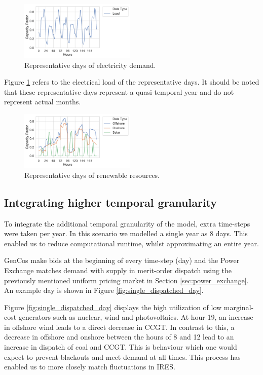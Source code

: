 \documentclass[final,3p,times,twocolumn,numbers]{elsarticle}
\begin{document}
\begin{figure}
\centering
\includegraphics[width=0.49\textwidth]{figures/methods_and_materials/clusters_results_load.pdf}
\caption{Representative days of electricity demand.}
\label{fig:clusters_compared_load}
\end{figure}

Figure \ref{fig:clusters_compared_load} refers to the electrical load of the representative days. It should be noted that these representative days represent a quasi-temporal year and do not represent actual months.


\begin{figure}
\centering
\includegraphics[width=0.49\textwidth]{figures/methods_and_materials/clusters_results_resources.pdf}
\caption{Representative days of renewable resources.}
\label{fig:clusters_compared_resources}
\end{figure}


\subsection{Integrating higher temporal granularity}

To integrate the additional temporal granularity of the model, extra time-steps were taken per year. In this scenario we modelled a single year as 8 days. This enabled us to reduce computational runtime, whilst approximating an entire year.

GenCos make bids at the beginning of every time-step (day) and the Power Exchange matches demand with supply in merit-order dispatch using the previously mentioned uniform pricing market in Section \ref{sec:power_exchange}. An example day is shown in Figure \ref{fig:single_dispatched_day}. 

Figure \ref{fig:single_dispatched_day} displays the high utilization of low marginal-cost generators such as nuclear, wind and photovoltaics. At hour 19, an increase in offshore wind leads to a direct decrease in CCGT. In contrast to this, a decrease in offshore and onshore between the hours of 8 and 12 lead to an increase in dispatch of coal and CCGT. This is behaviour which one would expect to prevent blackouts and meet demand at all times. This process has enabled us to more closely match fluctuations in IRES.
\end{document}

